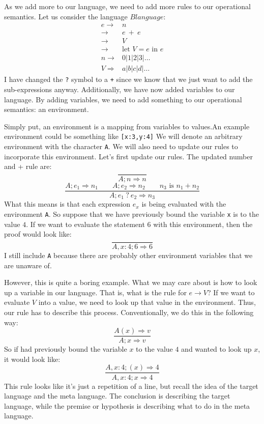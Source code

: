 \documentclass[main.tex]{subfiles}
\begin{document}
As we add more to our language, we need to add more rules to our operational semantics. Let us consider the language $Blanguage$:
$$\begin{array}{rl}
e \rightarrow & n\\
\rightarrow & e\ +\ e\\
\rightarrow & V\\
\rightarrow & \text{let }V = e \text{ in } e\\ 
n \rightarrow & 0|1|2|3|\dots\\
V \Rightarrow & a|b|c|d|\dots
\end{array}$$
I have changed the \texttt{?} symbol to a \texttt{+} since we know that we just want to add the sub-expressions anyway. Additionally, we have now added variables to our language. By adding variables, we need to add something to our operational semantics: an environment. 

Simply put, an environment is a mapping from variables to values.An example environment could be something like \texttt{[x:3,y:4]} We will denote an arbitrary environment with the character \texttt{A}. We will also need to update our rules to incorporate this environment. Let's first update our rules. The updated number and + rule are:
$$
\frac{}{A;n \Rightarrow n}$$
$$
\frac{A;e_1 \Rightarrow n_1 \qquad A;e_2 \Rightarrow n_2 \qquad n_3 \text{ is } n_1 + n_2}{A;e_1\ ?\ e_2 \Rightarrow n_3}
$$
What this means is that each expression $e_x$ is being evaluated with the environment \texttt{A}. So suppose that we have previously bound the variable \texttt{x} is to the value $4$. If we want to evaluate the statement $6$ with this environment, then the proof would look like:
$$
\frac{}{A,x:4; 6 \Rightarrow 6}
$$
I still include \texttt{A} because there are probably other environment variables that we are unaware of. 

However, this is quite a boring example. What we may care about is how to look up a variable in our language. That is, what is the rule for $e \rightarrow V$? If we want to evaluate $V$ into a value, we need to look up that value in the environment. Thus, our rule has to describe this process. Conventionally, we do this in the following way:
$$\frac{A(x) \Rightarrow v}{A;x \Rightarrow v}$$
So if had previously bound the variable $x$ to the value $4$ and wanted to look up $x$, it would look like:
$$
\frac{A,x:4;(x) \Rightarrow 4}{A,x:4;x \Rightarrow 4}
$$
This rule looks like it's just a repetition of a line, but recall the idea of the target language and the meta language. The conclusion is describing the target language, while the premise or hypothesis is describing what to do in the meta language.
\end{document}
